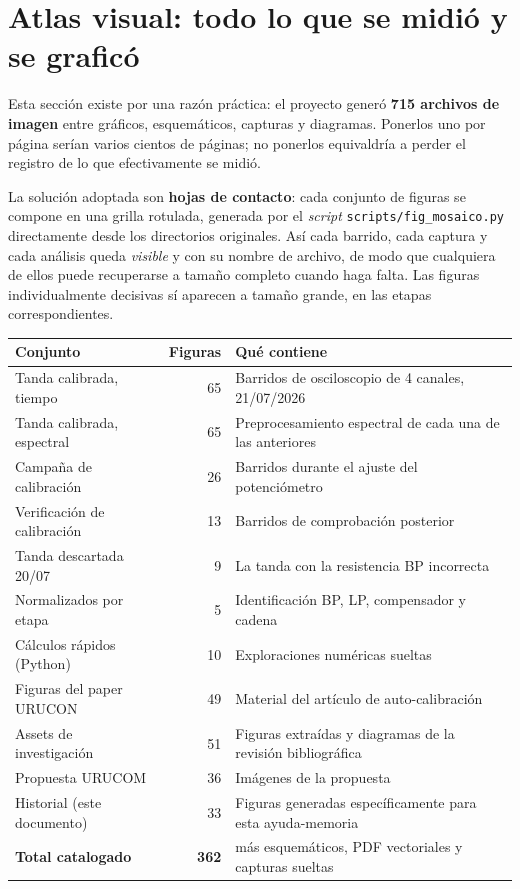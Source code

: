 \section{Atlas visual: todo lo que se midi\'o y se grafic\'o}
\label{sec:atlas}

Esta secci\'on existe por una raz\'on pr\'actica: el proyecto gener\'o
\textbf{715 archivos de imagen} entre gr\'aficos, esquem\'aticos, capturas y
diagramas. Ponerlos uno por p\'agina ser\'ian varios cientos de p\'aginas; no
ponerlos equivaldr\'ia a perder el registro de lo que efectivamente se midi\'o.

La soluci\'on adoptada son \textbf{hojas de contacto}: cada conjunto de figuras se
compone en una grilla rotulada, generada por el \emph{script}
\texttt{scripts/fig\_mosaico.py} directamente desde los directorios originales.
As\'i cada barrido, cada captura y cada an\'alisis queda \emph{visible} y con su
nombre de archivo, de modo que cualquiera de ellos puede recuperarse a tama\~no
completo cuando haga falta. Las figuras individualmente decisivas s\'i aparecen a
tama\~no grande, en las etapas correspondientes.

\begin{center}\footnotesize
\begin{tabularx}{\textwidth}{@{}l r X@{}}
\toprule
Conjunto & Figuras & Qu\'e contiene \\
\midrule
Tanda calibrada, tiempo & 65 & Barridos de osciloscopio de 4 canales, 21/07/2026 \\
Tanda calibrada, espectral & 65 & Preprocesamiento espectral de cada una de las anteriores \\
Campa\~na de calibraci\'on & 26 & Barridos durante el ajuste del potenci\'ometro \\
Verificaci\'on de calibraci\'on & 13 & Barridos de comprobaci\'on posterior \\
Tanda descartada 20/07 & 9 & La tanda con la resistencia BP incorrecta \\
Normalizados por etapa & 5 & Identificaci\'on BP, LP, compensador y cadena \\
C\'alculos r\'apidos (Python) & 10 & Exploraciones num\'ericas sueltas \\
Figuras del paper URUCON & 49 & Material del art\'iculo de auto-calibraci\'on \\
Assets de investigaci\'on & 51 & Figuras extra\'idas y diagramas de la revisi\'on bibliogr\'afica \\
Propuesta URUCOM & 36 & Im\'agenes de la propuesta \\
Historial (este documento) & 33 & Figuras generadas espec\'ificamente para esta ayuda-memoria \\
\midrule
\textbf{Total catalogado} & \textbf{362} & m\'as esquem\'aticos, PDF vectoriales y capturas sueltas \\
\bottomrule
\end{tabularx}
\end{center}

